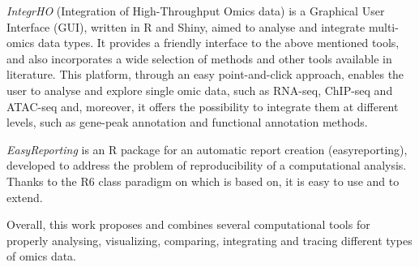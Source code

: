 {\textit{IntegrHO} (Integration of High-Throughput Omics data) is a Graphical User Interface (GUI), written in R and Shiny, aimed to analyse and integrate multi-omics data types. It provides a friendly interface to the above mentioned tools, and also incorporates a wide selection of methods and other tools available in literature. This platform, through an easy point-and-click approach, enables the user to analyse and explore single omic data, such as RNA-seq, ChIP-seq and ATAC-seq and, moreover, it offers the possibility to integrate them at different levels, such as gene-peak annotation and functional annotation methods.

\textit{EasyReporting} is an R package for an automatic report creation (easyreporting), developed to address the problem of reproducibility of a computational analysis.  
Thanks to the R6 class paradigm on which is based on, it is easy to use and to extend.

Overall, this work proposes and combines several computational tools for properly analysing, visualizing, comparing, integrating and tracing different types of omics data.
}